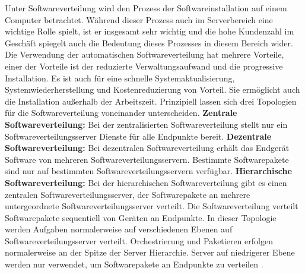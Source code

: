 Unter Softwareverteilung wird den Prozess der Softwareinstallation auf einem Computer
betrachtet. Während dieser Prozess auch im Serverbereich eine wichtige Rolle
spielt, ist er insgesamt sehr wichtig und die hohe Kundenzahl im Geschäft spiegelt
auch die Bedeutung dieses Prozesses in diesem Bereich wider. Die Verwendung der
automatischen Softwareverteilung hat mehrere Vorteile, einer der Vorteile ist der reduzierte
Verwaltungsaufwand und die progressive Installation. Es ist auch für eine
schnelle Systemaktualisierung, Systemwiederherstellung und Kostenreduzierung
von Vorteil. Sie ermöglicht auch die Installation außerhalb der Arbeitszeit.
Prinzipiell lassen sich drei Topologien für die Softwareverteilung voneinander unterscheiden.
\newline\newline
\textbf{Zentrale Softwareverteilung:} Bei der zentralisierten Softwareverteilung stellt nur 
ein Softwareverteilungsserver Dienste für alle Endpunkte bereit.
\newline
\textbf{Dezentrale Softwareverteilung:} Bei dezentralen Softwareverteilung erhält das Endgerät Software von mehreren Softwareverteilungsservern. 
Bestimmte Softwarepakete sind nur auf bestimmten Softwareverteilungsservern verfügbar.
\newline
\textbf{Hierarchische Softwareverteilung:} Bei der hierarchischen Softwareverteilung gibt es einen zentralen Softwareverteilungsserver, 
der Softwarepakete an mehrere untergeordnete Softwareverteilungsserver verteilt. 
Die Softwareverteilung verteilt Softwarepakete sequentiell von Geräten an Endpunkte. 
In dieser Topologie werden Aufgaben normalerweise auf verschiedenen Ebenen auf Softwareverteilungsserver verteilt. Orchestrierung und Paketieren erfolgen normalerweise an der Spitze der Server Hierarchie. Server auf niedrigerer Ebene werden nur verwendet, um Softwarepakete an Endpunkte zu verteilen \cite{FernandoBritoE:AbreuDaSilva}.